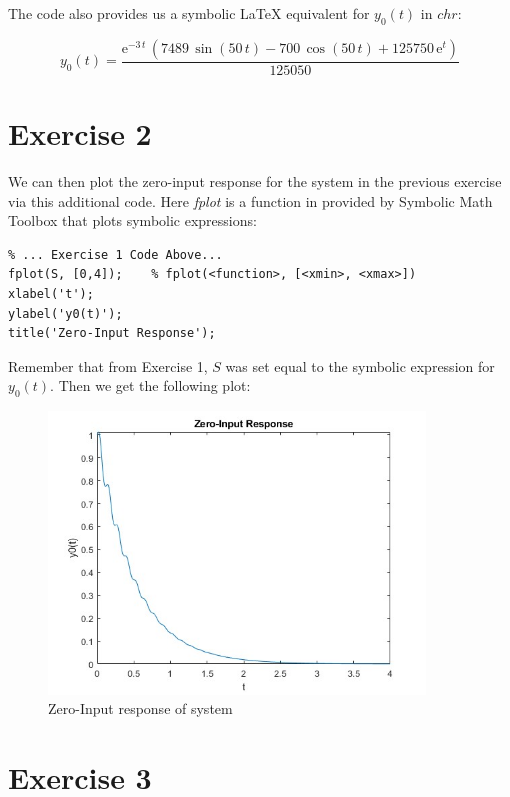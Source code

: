 \documentclass{article}
\begin{document}
The code also provides us a symbolic LaTeX equivalent for \(y_0(t)\) in \(chr\):

\begin{equation}
   y_0(t) = \frac{{\mathrm{e}}^{-3\,t}\,\left(7489\,\sin\left(50\,t\right)-700\,\cos\left(50\,t\right)+125750\,{\mathrm{e}}^t\right)}{125050} 
\end{equation}

\clearpage

\section{Exercise 2}

We can then plot the zero-input response for the system in the previous exercise via this additional code. Here \textit{fplot} is a function in provided by Symbolic Math Toolbox that plots symbolic expressions:

\begin{lstlisting}
% ... Exercise 1 Code Above...
fplot(S, [0,4]);    % fplot(<function>, [<xmin>, <xmax>])
xlabel('t');
ylabel('y0(t)');
title('Zero-Input Response');
\end{lstlisting}

Remember that from Exercise 1, \(S\) was set equal to the symbolic expression for \(y_0(t)\). Then we get the following plot:

\begin{figure}[!ht] 
    \centering
    \includegraphics[width = 10cm]{q2.jpg}
    \caption{Zero-Input response of system}
    \label{fig:zeroinput}
\end{figure}

\section{Exercise 3}
\end{document}
